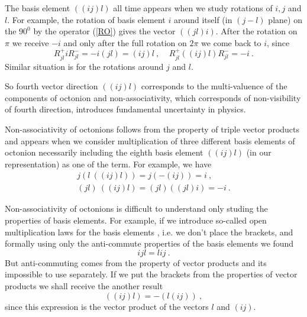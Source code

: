 \documentclass[a4paper,12pt]{article}
\begin{document}
The basis element $((ij)l)$ all time appears when we study rotations of $i, j$ and $l$. 
For example, the rotation of basis element $i$ around itself (in $(j-l)$ plane) on the 
$90^0$ by the operator (\ref{RO}) gives the vector $((jl)i)$. After the rotation on $\pi $ 
we receive $-i$ and only after the full rotation on $2\pi$ we come back to $i$, since
\begin{equation} \label{Ri}
R^+_{jl} i R^-_{jl} = -i(jl) = (ij)l ~, ~~~~~ R^+_{jl} ((ij)l) R^-_{jl} = -i ~.
\end{equation} 
Similar situation is for the rotations around $j$ and $l$. 

So fourth vector direction $((ij)l)$ corresponds to the multi-valuence of the components 
of octonion and non-associativity, which corresponds of non-visibility of fourth 
direction, introduces fundamental uncertainty in physics. 

Non-associativity of octonions follows from the property of triple vector products and 
appears when we consider multiplication of three different basis elements of octonion 
necessarily including the eighth basis element $((ij)l)$ (in our representation) as one 
of the term. For example, we have
\begin{eqnarray} \label{nonasso}
j \left( l ~((ij)l)\right) = j \left(-(ij)\right) = i ~,\\
(jl)~((ij)l) = (jl)((jl)i) = -i ~.
\end{eqnarray}

Non-associativity of octonions is difficult to understand only studing the properties 
of basis elements. For example, if we introduce so-called open multiplication laws for 
the basis elements \cite{Ku}, i.e. we don't place the brackets, and formally using only 
the anti-commute properties of the basis elements we found 
\begin{equation} \label{ijl1}
ijl = lij ~. 
\end{equation}
But anti-commuting comes from the property of vector products and its impossible to use 
separately. If we put the brackets from the properties of vector products we shall 
receive the another result 
\begin{equation} \label{(ij)i}
((ij)l) = - (l(ij))~, 
\end{equation}
since this expression is the vector product of the vectors $l$ and $(ij)$.
\end{document}
